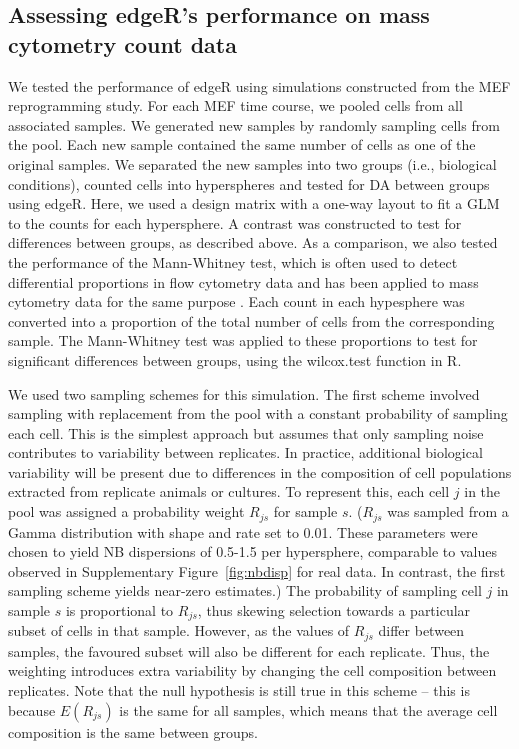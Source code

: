 \documentclass{article}
\begin{document}
\subsection{Assessing edgeR's performance on mass cytometry count data}
\label{sec:edgeRsim}
We tested the performance of edgeR using simulations constructed from the MEF reprogramming study.
For each MEF time course, we pooled cells from all associated samples.
We generated new samples by randomly sampling cells from the pool.
Each new sample contained the same number of cells as one of the original samples.
We separated the new samples into two groups (i.e., biological conditions), counted cells into hyperspheres and tested for DA between groups using edgeR.
Here, we used a design matrix with a one-way layout to fit a GLM to the counts for each hypersphere.
A contrast was constructed to test for differences between groups, as described above.
As a comparison, we also tested the performance of the Mann-Whitney test, which is often used to detect differential proportions in flow cytometry data \cite{watson1992significance} and has been applied to mass cytometry data for the same purpose \cite{behbehani2015mass}.
Each count in each hypesphere was converted into a proportion of the total number of cells from the corresponding sample.
The Mann-Whitney test was applied to these proportions to test for significant differences between groups, using the wilcox.test function in R.

We used two sampling schemes for this simulation.
The first scheme involved sampling with replacement from the pool with a constant probability of sampling each cell.
This is the simplest approach but assumes that only sampling noise contributes to variability between replicates.
In practice, additional biological variability will be present due to differences in the composition of cell populations extracted from replicate animals or cultures.
To represent this, each cell $j$ in the pool was assigned a probability weight $R_{js}$ for sample $s$.
($R_{js}$ was sampled from a Gamma distribution with shape and rate set to 0.01.
These parameters were chosen to yield NB dispersions of 0.5-1.5 per hypersphere, comparable to values observed in Supplementary Figure~\ref{fig:nbdisp} for real data.
In contrast, the first sampling scheme yields near-zero estimates.)
The probability of sampling cell $j$ in sample $s$ is proportional to $R_{js}$, thus skewing selection towards a particular subset of cells in that sample.
However, as the values of $R_{js}$ differ between samples, the favoured subset will also be different for each replicate.
Thus, the weighting introduces extra variability by changing the cell composition between replicates.
Note that the null hypothesis is still true in this scheme -- this is because $E(R_{js})$ is the same for all samples, which means that the average cell composition is the same between groups.
\end{document}
